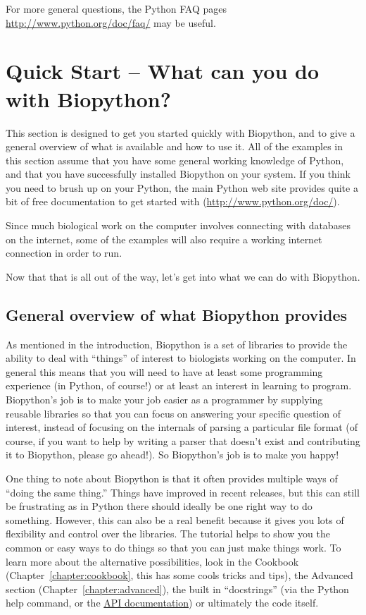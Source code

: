 \documentclass{report}
\begin{document}
\noindent For more general questions, the Python FAQ pages \url{http://www.python.org/doc/faq/} may be useful.

\chapter{Quick Start -- What can you do with Biopython?}
\label{chapter:quick-start}

This section is designed to get you started quickly with Biopython, and to give a general overview of what is available and how to use it. All of the examples in this section assume that you have some general working knowledge of Python, and that you have successfully installed Biopython on your system. If you think you need to brush up on your Python, the main Python web site provides quite a bit of free documentation to get started with (\url{http://www.python.org/doc/}).

Since much biological work on the computer involves connecting with databases on the internet, some of the examples will also require a working internet connection in order to run.

Now that that is all out of the way, let's get into what we can do with Biopython.

\section{General overview of what Biopython provides}

As mentioned in the introduction, Biopython is a set of libraries to provide the ability to deal with ``things'' of interest to biologists working on the computer. In general this means that you will need to have at least some programming experience (in Python, of course!) or at least an interest in learning to program. Biopython's job is to make your job easier as a programmer by supplying reusable libraries so that you can focus on answering your specific question of interest, instead of focusing on the internals of parsing a particular file format (of course, if you want to help by writing a parser that doesn't exist and contributing it to Biopython, please go ahead!). So Biopython's job is to make you happy!

One thing to note about Biopython is that it often provides multiple ways of ``doing the same thing.'' Things have improved in recent releases, but this can still be frustrating as in Python there should ideally be one right way to do something. However, this can also be a real benefit because it gives you lots of flexibility and control over the libraries. The tutorial helps to show you the common or easy ways to do things so that you can just make things work. To learn more about the alternative possibilities, look in the Cookbook (Chapter~\ref{chapter:cookbook}, this has some cools tricks and tips), the Advanced section (Chapter~\ref{chapter:advanced}), the built in ``docstrings'' (via the Python help command, or the \href{http://biopython.org/DIST/docs/api/}{API documentation}) or ultimately the code itself.
\end{document}
